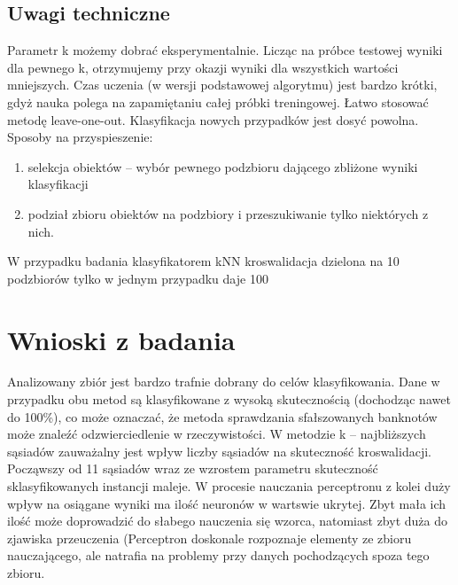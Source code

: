 \documentclass{classrep}
\begin{document}
\subsection{Uwagi techniczne}
Parametr k możemy dobrać eksperymentalnie. Licząc na próbce testowej wyniki dla pewnego k, otrzymujemy przy okazji wyniki dla wszystkich wartości mniejszych.
Czas uczenia (w wersji podstawowej algorytmu) jest bardzo krótki, gdyż nauka polega na zapamiętaniu całej próbki treningowej. Łatwo stosować metodę leave-one-out.
Klasyfikacja nowych przypadków jest dosyć powolna. Sposoby na przyspieszenie:
\begin{enumerate}
\item selekcja obiektów – wybór pewnego podzbioru dającego zbliżone wyniki klasyfikacji
\item podział zbioru obiektów na podzbiory i przeszukiwanie tylko niektórych z nich.
\end{enumerate}

W przypadku badania klasyfikatorem kNN kroswalidacja dzielona na 10 podzbiorów tylko w jednym przypadku daje 100%


\section{Wnioski z badania}
Analizowany zbiór jest bardzo trafnie dobrany do celów klasyfikowania. Dane w przypadku obu metod są klasyfikowane z wysoką skutecznością (dochodząc nawet do 100\%), co może oznaczać, że metoda sprawdzania sfałszowanych banknotów może znaleźć odzwierciedlenie w rzeczywistości. W metodzie k – najbliższych sąsiadów zauważalny jest wpływ liczby sąsiadów na skuteczność kroswalidacji. Począwszy od 11 sąsiadów wraz ze wzrostem parametru skuteczność sklasyfikowanych instancji maleje. W procesie nauczania perceptronu z kolei duży wpływ na osiągane wyniki ma ilość neuronów w wartswie ukrytej. Zbyt mała ich ilość może doprowadzić do słabego nauczenia się wzorca, natomiast zbyt duża do zjawiska przeuczenia (Perceptron doskonale rozpoznaje elementy ze zbioru nauczającego, ale natrafia na problemy przy danych pochodzących spoza tego zbioru.
\end{document}
